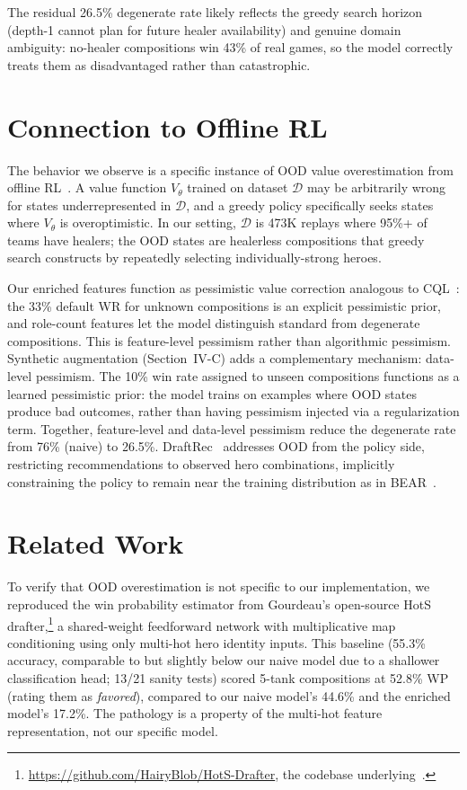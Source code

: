 \documentclass[conference]{IEEEtran}
\begin{document}
The residual 26.5\% degenerate rate likely reflects the greedy search horizon (depth-1 cannot plan for future healer availability) and genuine domain ambiguity: no-healer compositions win 43\% of real games, so the model correctly treats them as disadvantaged rather than catastrophic.

\section{Connection to Offline RL}

The behavior we observe is a specific instance of OOD value overestimation from offline RL~\cite{kumar2020conservative,levine2020offline}. A value function $V_\theta$ trained on dataset $\mathcal{D}$ may be arbitrarily wrong for states underrepresented in $\mathcal{D}$, and a greedy policy specifically seeks states where $V_\theta$ is overoptimistic. In our setting, $\mathcal{D}$ is 473K replays where 95\%+ of teams have healers; the OOD states are healerless compositions that greedy search constructs by repeatedly selecting individually-strong heroes.

Our enriched features function as pessimistic value correction analogous to CQL~\cite{kumar2020conservative}: the 33\% default WR for unknown compositions is an explicit pessimistic prior, and role-count features let the model distinguish standard from degenerate compositions. This is feature-level pessimism rather than algorithmic pessimism. Synthetic augmentation (Section~IV-C) adds a complementary mechanism: data-level pessimism. The 10\% win rate assigned to unseen compositions functions as a learned pessimistic prior: the model trains on examples where OOD states produce bad outcomes, rather than having pessimism injected via a regularization term. Together, feature-level and data-level pessimism reduce the degenerate rate from 76\% (naive) to 26.5\%. DraftRec~\cite{lee2022draftrec} addresses OOD from the policy side, restricting recommendations to observed hero combinations, implicitly constraining the policy to remain near the training distribution as in BEAR~\cite{kumar2019stabilizing}.

\section{Related Work}

To verify that OOD overestimation is not specific to our implementation, we reproduced the win probability estimator from Gourdeau's open-source HotS drafter,\footnote{\url{https://github.com/HairyBlob/HotS-Drafter}, the codebase underlying~\cite{gourdeau2021discriminative}.} a shared-weight feedforward network with multiplicative map conditioning using only multi-hot hero identity inputs. This baseline (55.3\% accuracy, comparable to but slightly below our naive model due to a shallower classification head; 13/21 sanity tests) scored 5-tank compositions at 52.8\% WP (rating them as \textit{favored}), compared to our naive model's 44.6\% and the enriched model's 17.2\%. The pathology is a property of the multi-hot feature representation, not our specific model.
\end{document}
